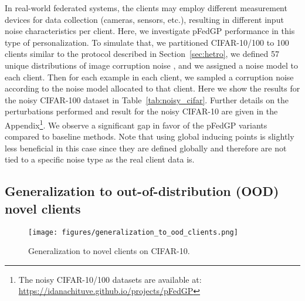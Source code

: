 \documentclass{article}
\newcommand{\tblref}[1]{Table~\ref{#1}}
\begin{document}
In real-world federated systems, the clients may employ different measurement devices for data collection (cameras, sensors, etc.), resulting in different input noise characteristics per client.
Here, we investigate pFedGP performance in this type of personalization. To simulate that, we partitioned CIFAR-10/100 to 100 clients similar to the protocol described in Section~\ref{sec:hetro}, we defined 57 unique distributions of image corruption noise \cite{hendrycks2018benchmarking}, and we assigned a noise model to each client. Then for each example in each client, we sampled a corruption noise according to the noise model allocated to that client. Here we show the results for the noisy CIFAR-100 dataset in \tblref{tab:noisy_cifar}.
Further details on the perturbations performed and result for the noisy CIFAR-10 are given in the Appendix\footnote{The noisy CIFAR-10/100 datasets are available at: \textcolor{magenta}{\href{https://idanachituve.github.io/projects/pFedGP/}{https://idanachituve.github.io/projects/pFedGP}}}. We observe a significant gap in favor of the pFedGP variants compared to baseline methods. Note that using global inducing points is slightly less beneficial in this case since they are defined globally and therefore are not tied to a specific noise type as the real client data is. 









\subsection{Generalization to out-of-distribution (OOD) novel clients} \label{sec:exp_gen_ood_clients}

\begin{wrapfigure}[14]{r}{0.5\textwidth}
    \vspace{-10pt}
    \centering
    \texttt{[image: figures/generalization\_to\_ood\_clients.png]}
    \caption{Generalization to novel clients on CIFAR-10.}
    \label{fig:gen}
\end{wrapfigure}
\end{document}
